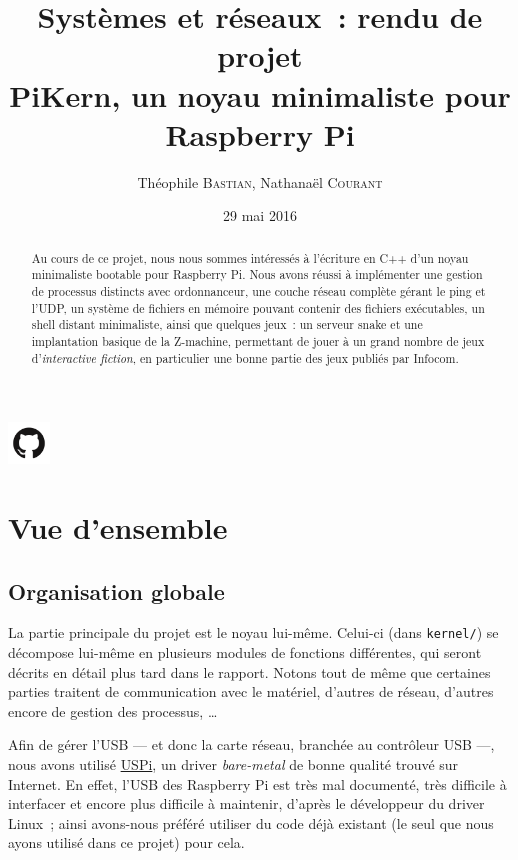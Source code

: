 \documentclass[11pt,a4paper]{article}
\author{Théophile \textsc{Bastian}, Nathanaël \textsc{Courant}}
\title{Systèmes et réseaux~: rendu de projet\\
{\small PiKern, un noyau minimaliste pour Raspberry Pi}}
\date{29 mai 2016}
\newcommand{\fname}[1]{\texttt{#1}} %
\begin{document}
\maketitle

\begin{abstract}
Au cours de ce projet, nous nous sommes intéressés à l'écriture en C++ d'un
noyau minimaliste bootable pour Raspberry Pi. Nous avons réussi à implémenter
une gestion de processus distincts avec ordonnanceur, une couche réseau
complète gérant le ping et l'UDP, un système de fichiers en mémoire
pouvant contenir des fichiers exécutables, un shell distant
minimaliste, ainsi que quelques jeux~: un serveur snake et une
implantation basique de la Z-machine, permettant de jouer à un grand
nombre de jeux d'\textit{interactive fiction}, en particulier une
bonne partie des jeux publiés par Infocom.
\end{abstract}

\begin{center}
	\href{https://github.com/tobast/sysres-pikern}
		{\Large \includegraphics[height=3em]{github.png}
		}
\end{center}

\tableofcontents
\newpage

\section{Vue d'ensemble}

\subsection{Organisation globale}
La partie principale du projet est le noyau lui-même. Celui-ci (dans
\fname{kernel/}) se décompose lui-même en plusieurs modules de fonctions
différentes, qui seront décrits en détail plus tard dans le rapport. Notons
tout de même que certaines parties traitent de communication avec le matériel,
d'autres de réseau, d'autres encore de gestion des processus, \ldots

Afin de gérer l'USB --- et donc la carte réseau, branchée au contrôleur
USB ---, nous avons utilisé \href{https://github.com/rsta2/uspi}{USPi}, un
driver \textit{bare-metal} de bonne qualité trouvé sur Internet. En effet,
l'USB des Raspberry Pi est très mal documenté, très difficile à interfacer
et encore plus difficile à maintenir, d'après le développeur du driver Linux~;
ainsi avons-nous préféré utiliser du code déjà existant (le seul que nous ayons
utilisé dans ce projet) pour cela.
\end{document}

